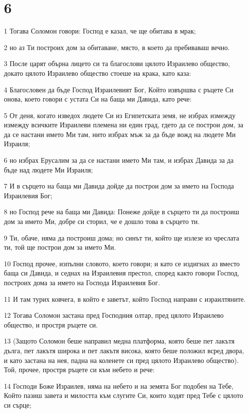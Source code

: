 \chapter{6}

\par 1 Тогава Соломон говори: Господ е казал, че ще обитава в мрак;
\par 2 но аз Ти построих дом за обитаване, място, в което да пребиваваш вечно.
\par 3 После царят обърна лицето си та благослови цялото Израилево общество, докато цялото Израилево общество стоеше на крака, като каза:
\par 4 Благословен да бъде Господ Израилевият Бог, Който извършва с ръцете Си онова, което говори с устата Си на баща ми Давида, като рече:
\par 5 От деня, когато изведох людете Си из Египетската земя, не избрах измежду измежду всичките Израилеви племена ни един град, гдето да се построи дом, за да се настани името Ми там, нито избрах мъж за да бъде вожд на людете Ми Израиля;
\par 6 но избрах Ерусалим за да се настани името Ми там, и избрах Давида за да бъде над людете Ми Израиля;
\par 7 И в сърцето на баща ми Давида дойде да построи дом за името на Господа Израилевия Бог;
\par 8 но Господ рече на баща ми Давида: Понеже дойде в сърцето ти да построиш дом за името Ми, добре си сторил, че е дошло това в сърцето ти.
\par 9 Ти, обаче, няма да построиш дома; но синът ти, който ще излезе из чреслата ти, той ще построи дом за името Ми.
\par 10 Господ прочее, изпълни словото, което говори; и като се издигнах аз вместо баща си Давида, и седнах на Израилевия престол, според както говори Господ, построих дома за името на Господа Израилевия Бог.
\par 11 И там турих ковчега, в който е заветът, който Господ направи с израилтяните.
\par 12 Тогава Соломон застана пред Господния олтар, пред цялото Израилево общество, и простря ръцете си.
\par 13 (Защото Соломон беше направил медна платформа, която беше пет лакътя дълга, пет лакътя широка и пет лакътя висока, която беше положил всред двора, и като застана на нея, падна на коленете си пред цялото Израилево общество). Той, прочее, простря ръцете си към небето и рече:
\par 14 Господи Боже Израилев, няма на небето и на земята Бог подобен на Тебе, Който пазиш завета и милостта към слугите Си, които ходят пред Тебе с цялото си сърце;
